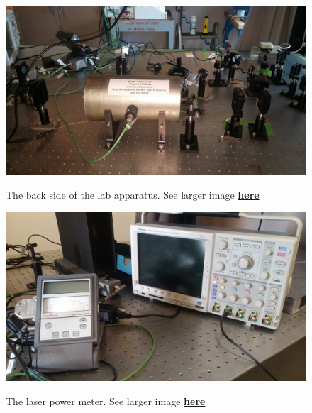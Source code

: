 \documentclass{../lab}
\begin{document}
\begin{figure}[H]
\captionsetup{justification=centering}
\begin{minipage}[t]{0.35\textwidth}
    \href{http://experimentationlab.berkeley.edu/sites/default/files/images/MNObackside.jpg}{\includegraphics[width=\linewidth,keepaspectratio]{images/MNObackside.jpg}}
    \caption{The back side of the lab apparatus. See larger image \href{http://experimentationlab.berkeley.edu/sites/default/files/images/MNObackside.jpg}{\textbf{here}}}
\end{minipage}
\begin{minipage}[t]{0.35\textwidth}
    \href{http://experimentationlab.berkeley.edu/sites/default/files/images/MNOlaserpowermeter.jpg}{\includegraphics[width=\linewidth,keepaspectratio]{images/MNOlaserpowermeter.jpg}}
    \caption{The laser power meter. See larger image \href{http://experimentationlab.berkeley.edu/sites/default/files/images/MNOlaserpowermeter.jpg}{\textbf{here}}}
\end{minipage}
\begin{minipage}[t]{0.26\textwidth}

\end{minipage}
\end{figure}
\end{document}

